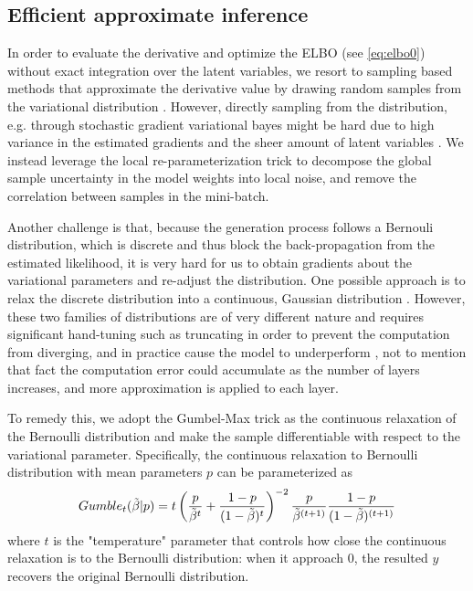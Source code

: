 \subsection{Efficient approximate inference}\label{sec:approximate-inference}

In order to evaluate the derivative and optimize the ELBO (see \autoref{eq:elbo0}) without exact integration over the latent variables, 
we resort to sampling based methods 
that approximate the derivative value by drawing random samples from the variational distribution \cite{ranganath2014black}. 
However, directly sampling from the distribution, e.g. through stochastic gradient variational bayes  \cite{rezende2014stochastic} might be hard due to high variance in the estimated gradients and the sheer amount of latent variables \cite{kingma2015variational}.
We instead leverage the local re-parameterization trick \citep{Kingma2015} to  
decompose the global sample uncertainty in the model weights into local noise, and remove the correlation between samples in the mini-batch.

Another challenge is that, because the generation process follows a Bernouli distribution, 
which is discrete and thus block the back-propagation from the estimated likelihood, 
it is very hard for us to obtain gradients about the variational parameters and re-adjust the distribution. 
One possible approach is to relax the discrete distribution into a continuous, Gaussian distribution \cite{wang2013fast, chen2019large}. However, these two families of distributions are of very different nature and 
requires significant hand-tuning such as truncating in order  to prevent the computation from diverging, and in practice cause the model to underperform \cite{molchanov2016dropout}, not to mention that fact the computation error could accumulate as the number of layers increases, and more  approximation is applied to each layer. 

To remedy this, we adopt the Gumbel-Max trick \cite{gumbel1954statistical, gummaddison2014sampling} as the continuous relaxation of the Bernoulli distribution
and 
make the sample differentiable with respect to the variational parameter. 
Specifically, the continuous relaxation to Bernoulli distribution with mean parameters $p$ can be parameterized as
\begin{equation}
Gumble_{t}( \tilde{\beta} | p) = t \left( \frac{p}{\tilde{\beta}^t} + \frac{1 - p}{(1- \tilde{\beta})^t} \right)^{-2} 
\frac{p}{\tilde{\beta}^{(t + 1)}} \frac{1 - p}{(1 - \tilde{\beta})^{(t + 1)}}  
\\
\end{equation}
where $t$ is the "temperature" parameter that controls how close the continuous relaxation is to the Bernoulli distribution: when it approach 0, the resulted $y$ recovers the original Bernoulli distribution.

